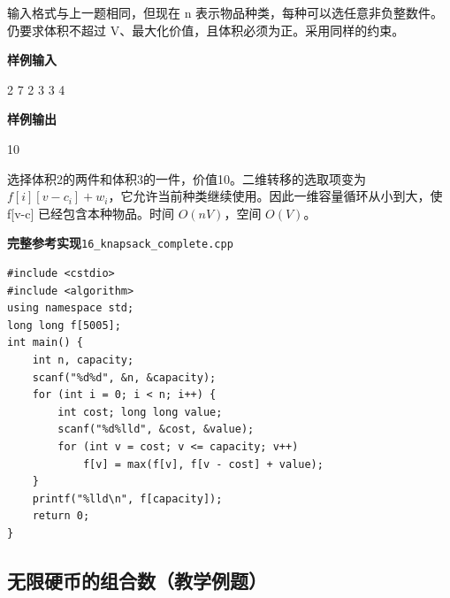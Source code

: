 \documentclass[UTF8,11pt,a4paper,fontset=none]{ctexart}
\begin{document}
输入格式与上一题相同，但现在 n 表示物品种类，每种可以选任意非负整数件。仍要求体积不超过 V、最大化价值，且体积必须为正。采用同样的约束。
\begin{tcolorbox}[samplebox,title={输入输出样例}]
\textbf{样例输入}
\begin{Sample}
2 7
2 3
3 4
\end{Sample}
\tcblower
\textbf{样例输出}
\begin{Sample}
10
\end{Sample}
\end{tcolorbox}
选择体积2的两件和体积3的一件，价值10。二维转移的选取项变为 $f[i][v-c_i]+w_i$，它允许当前种类继续使用。因此一维容量循环从小到大，使 f[v-c] 已经包含本种物品。时间 $O(nV)$，空间 $O(V)$。
\par\noindent\begin{minipage}{\linewidth}
\textbf{完整参考实现}\quad\texttt{16\_knapsack\_complete.cpp}
\begin{lstlisting}
#include <cstdio>
#include <algorithm>
using namespace std;
long long f[5005];
int main() {
    int n, capacity;
    scanf("%d%d", &n, &capacity);
    for (int i = 0; i < n; i++) {
        int cost; long long value;
        scanf("%d%lld", &cost, &value);
        for (int v = cost; v <= capacity; v++)
            f[v] = max(f[v], f[v - cost] + value);
    }
    printf("%lld\n", f[capacity]);
    return 0;
}
\end{lstlisting}
\end{minipage}\par

\subsection{无限硬币的组合数（教学例题）}
\end{document}
